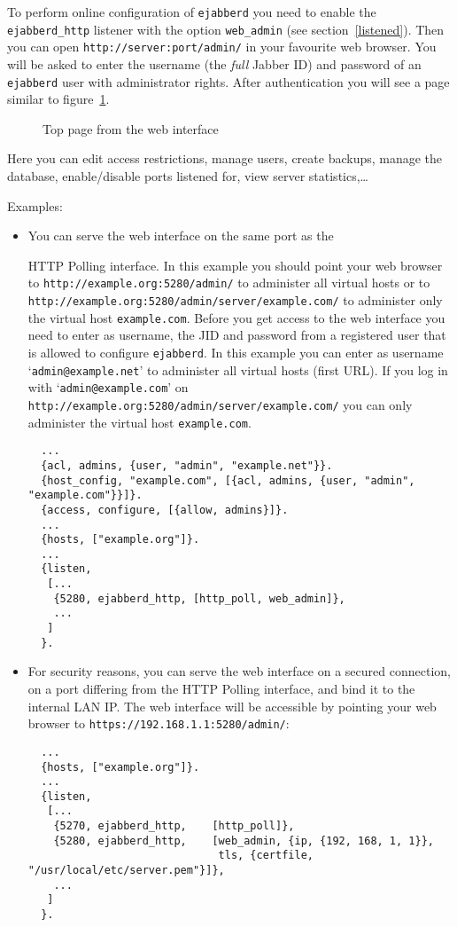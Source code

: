 \documentclass[a4paper,10pt]{book}
\newcommand{\ind}[1]{\begin{latexonly}\index{#1}\end{latexonly}}
\newcommand{\imgscale}{0.58}
\newcommand{\insimg}[1]{\insscaleimg{\imgscale}{#1}}
\newcommand{\insscaleimg}[2]{
  \imgsrc{#2}{}
  \begin{latexonly}
    \scalebox{#1}{\texttt{[image: \#2]}}
  \end{latexonly}
}
\newcommand{\jid}[1]{\texttt{#1}}
\newcommand{\term}[1]{\texttt{#1}}
\newcommand{\ejabberd}{\texttt{ejabberd}}
\newcommand{\Jabber}{Jabber}
\begin{document}
To perform online configuration of \ejabberd{} you need to enable the
\term{ejabberd\_http} listener with the option \term{web\_admin} (see
section~\ref{listened}). Then you can open 
\verb|http://server:port/admin/| in your favourite web browser. You
will be asked to enter the username (the \emph{full} \Jabber{} ID) and password
of an \ejabberd{} user with administrator rights. After authentication
you will see a page similar to figure~\ref{fig:webadmmain}.

\begin{figure}[htbp]
  \centering
  \insimg{webadmmain.png}
  \caption{Top page from the web interface}
  \label{fig:webadmmain}
\end{figure}
Here you can edit access restrictions, manage users, create backups,
manage the database, enable/disable ports listened for, view server
statistics,\ldots

Examples:
\begin{itemize}
\item You can serve the web interface on the same port as the
  \ind{protocols!XEP-0025: HTTP Polling}HTTP Polling interface. In this example
  you should point your web browser to \verb|http://example.org:5280/admin/| to
  administer all virtual hosts or to
  \verb|http://example.org:5280/admin/server/example.com/| to administer only
  the virtual host \jid{example.com}. Before you get access to the web interface
  you need to enter as username, the JID and password from a registered user
  that is allowed to configure \ejabberd{}. In this example you can enter as
  username `\jid{admin@example.net}' to administer all virtual hosts (first
  URL). If you log in with `\jid{admin@example.com}' on \\
  \verb|http://example.org:5280/admin/server/example.com/| you can only
  administer the virtual host \jid{example.com}.
  \begin{verbatim}
  ...
  {acl, admins, {user, "admin", "example.net"}}.
  {host_config, "example.com", [{acl, admins, {user, "admin", "example.com"}}]}.
  {access, configure, [{allow, admins}]}.
  ...
  {hosts, ["example.org"]}.
  ...
  {listen,
   [...
    {5280, ejabberd_http, [http_poll, web_admin]},
    ...
   ]
  }.
\end{verbatim}
\item For security reasons, you can serve the web interface on a secured
  connection, on a port differing from the HTTP Polling interface, and bind it
  to the internal LAN IP. The web interface will be accessible by pointing your
  web browser to \verb|https://192.168.1.1:5280/admin/|:
  \begin{verbatim}
  ...
  {hosts, ["example.org"]}.
  ...
  {listen,
   [...
    {5270, ejabberd_http,    [http_poll]},
    {5280, ejabberd_http,    [web_admin, {ip, {192, 168, 1, 1}},
                              tls, {certfile, "/usr/local/etc/server.pem"}]},
    ...
   ]
  }.
\end{verbatim}
\end{itemize}
\end{document}
